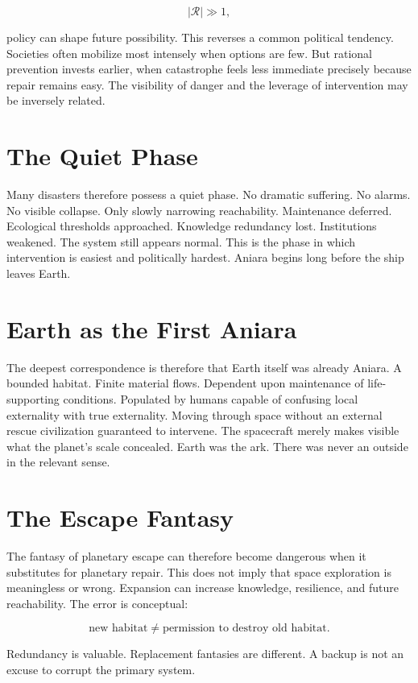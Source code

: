 \documentclass[11pt,oneside]{book}
\theoremstyle{definition}
\theoremstyle{remark}
\newcommand{\R}{\mathcal{R}}
\begin{document}
\[
|\R|\gg1,
\]

policy can shape future possibility. This reverses a common political tendency. Societies often
mobilize most intensely when options are few. But rational prevention invests earlier, when
catastrophe feels less immediate precisely because repair remains easy. The visibility of danger and
the leverage of intervention may be inversely related.

\section{The Quiet Phase}

Many disasters therefore possess a quiet phase. No dramatic suffering. No alarms. No visible
collapse. Only slowly narrowing reachability. Maintenance deferred. Ecological thresholds
approached. Knowledge redundancy lost. Institutions weakened. The system still appears normal. This
is the phase in which intervention is easiest and politically hardest. Aniara begins long before the
ship leaves Earth.

\section{Earth as the First Aniara}

The deepest correspondence is therefore that Earth itself was already Aniara. A bounded habitat.
Finite material flows. Dependent upon maintenance of life-supporting conditions. Populated by humans
capable of confusing local externality with true externality. Moving through space without an
external rescue civilization guaranteed to intervene. The spacecraft merely makes visible what the
planet's scale concealed. Earth was the ark. There was never an outside in the relevant sense.

\section{The Escape Fantasy}

The fantasy of planetary escape can therefore become dangerous when it substitutes for planetary
repair. This does not imply that space exploration is meaningless or wrong. Expansion can increase
knowledge, resilience, and future reachability. The error is conceptual:

\[
\text{new habitat} \neq \text{permission to destroy old habitat}.
\]

Redundancy is valuable. Replacement fantasies are different. A backup is not an excuse to corrupt
the primary system.
\end{document}
